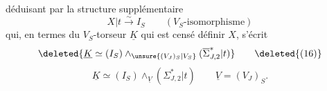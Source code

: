 déduisant par la  structure supplémentaire
\[
 X|t\xrightarrow{\sim}I_S\qquad(V_S\text{-isomorphisme}) \tag*{(15)}
\]
qui, en termes du $V_S$-torseur $\underline K$ qui est censé définir $X$, s'écrit
\[
 \deleted{\underline K\simeq(I_S)\mathbin{\wedge}_{\unsure{(V_J)_S|V_S}}(\overline\Sigma^*_{J,2}|t)} \tag*{\deleted{(16)}}
\]
\[
 \underline K\simeq(I_S)\mathbin{\wedge}_{\underline V}(\Sigma^*_{J,2}|t)\qquad \underline V=(V_J)_S. \tag*{(16)}
\]
